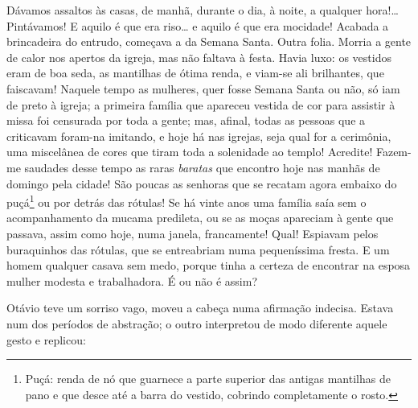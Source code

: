 {

Dávamos assaltos às casas, de manhã, durante o dia, à noite, a
qualquer hora!\ldots{} Pintávamos! E aquilo é que era riso\ldots{} e
aquilo é que era mocidade! Acabada a brincadeira do entrudo, começava a
da Semana Santa. Outra folia. Morria a gente de calor nos apertos da
igreja, mas não faltava à festa. Havia luxo: os vestidos eram de boa
seda, as mantilhas de ótima renda, e viam-se ali brilhantes, que
faiscavam! Naquele tempo as mulheres, quer fosse Semana Santa ou não, só
iam de preto à igreja; a primeira família que apareceu
vestida de cor para assistir à missa foi censurada por
toda a gente; mas, afinal, todas as pessoas que a criticavam
foram-na imitando, e hoje há nas igrejas, seja qual
for a cerimônia, uma miscelânea de
cores que tiram toda a solenidade ao templo! Acredite! Fazem-me
saudades desse tempo as raras \emph{baratas} que encontro hoje nas manhãs de
domingo pela cidade! São poucas as senhoras que se recatam agora embaixo
do puçá\footnote{Puçá: renda de nó que guarnece a parte superior das
  antigas mantilhas de pano e que desce até a barra do vestido, cobrindo
  completamente o rosto.} ou por detrás das rótulas! Se
há vinte anos uma família saía sem o acompanhamento da
mucama predileta, ou se as moças apareciam à gente que passava, assim
como hoje, numa janela, francamente! Qual! Espiavam pelos buraquinhos
das rótulas, que se entreabriam numa pequeníssima fresta. E um homem
qualquer casava sem medo, porque tinha a certeza de encontrar
na esposa mulher modesta e trabalhadora. É ou não é assim?

Otávio teve um sorriso vago, moveu a cabeça numa afirmação
indecisa. Estava num dos períodos de abstração; o outro
interpretou de modo diferente aquele gesto e replicou:


}
